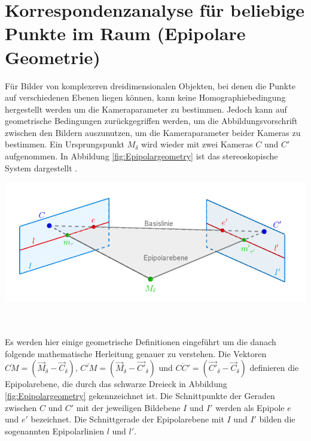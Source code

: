 \section{Korrespondenzanalyse für beliebige Punkte im Raum (Epipolare Geometrie)}
\label{sec:EpiolarContraints}

Für Bilder von komplexeren dreidimensionalen Objekten, bei denen die Punkte auf verschiedenen Ebenen liegen können, kann keine Homographiebedingung hergestellt werden um die Kameraparameter zu bestimmen. Jedoch kann auf geometrische Bedingungen zurückgegriffen werden, um die Abbildungsvorschrift zwischen den Bildern auszunutzen, um die Kameraparameter beider Kameras zu bestimmen. Ein Ursprungspunkt $M_\delta$ wird wieder mit zwei Kameras $C$ und $C'$ aufgenommen. In Abbildung \ref{fig:Epipolargeometry} ist das stereoskopische System dargestellt . 


\begin{minipage}{\linewidth}
	\centering
	\includegraphics[width=.8\linewidth]{images/EpipolarGeoemtrieGrafik_beschriftet.png}
	\label{fig:Epipolargeometry}
\end{minipage}\\ \\

Es werden hier einige geometrische Definitionen eingeführt um die danach folgende mathematische Herleitung genauer zu verstehen. Die Vektoren $\overline{CM} = (\vec{M}_\delta - \vec{C}_\delta),\, \overline{C'M} = (\vec{M}_\delta - \vec{C'}_\delta)$ und $\overline{CC'} = (\vec{C'}_\delta - \vec{C}_\delta)$ definieren die Epipolarebene, die durch das schwarze Dreieck in Abbildung \ref{fig:Epipolargeometry} gekennzeichnet ist. Die Schnittpunkte der Geraden zwischen $C$ und $C'$ mit der jeweiligen Bildebene $I$ und $I'$ werden als Epipole $e$ und $e'$ bezeichnet. Die Schnittgerade der Epipolarebene mit $I$ und $I'$ bilden die sogenannten Epipolarlinien $l$ und $l'$\cite{HZ,Zhang2014,ZZPaper,phdTwoView}.\\%

